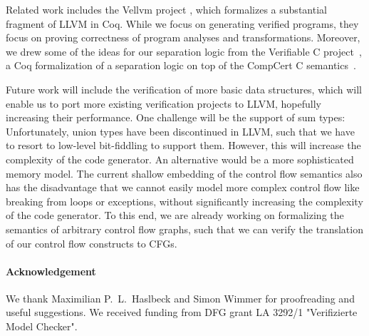 \documentclass[a4paper,oribibl,envcountsame]{llncs}
\begin{document}
Related work includes the Vellvm project \cite{ZNMZ12,ZNMZ13}, which formalizes a substantial fragment of LLVM in Coq.
While we focus on generating verified programs, they focus on proving correctness of program analyses and transformations. 
Moreover, we drew some of the ideas for our separation logic from the Verifiable C project~\cite{App14}, a Coq formalization of a separation logic on top of the CompCert C semantics~\cite{BL09}.

Future work will include the verification of more basic data structures, which will enable us to 
port more existing verification projects to LLVM, hopefully increasing their performance. 
One challenge will be the support of sum types: Unfortunately, union types have been discontinued in LLVM, such that we have to resort 
to low-level bit-fiddling to support them. However, this will increase the complexity of the code generator. An alternative would be a more sophisticated memory model.
The current shallow embedding of the control flow semantics also has the disadvantage that we cannot easily model more complex control flow like breaking from loops or exceptions, without significantly increasing the complexity of the code generator. To this end, we are already working on formalizing the semantics of 
arbitrary control flow graphs, such that we can verify the translation of our control flow constructs to CFGs.


{\footnotesize
\paragraph{\footnotesize Acknowledgement}
We thank Maximilian P.\ L.\ Haslbeck and Simon Wimmer for proofreading and useful suggestions.
We received funding from DFG grant LA 3292/1 "Verifizierte Model Checker".
}

\clearpage

% 
% 
% 
% 
% 
% 
  
  
  
% 
% 



\end{document}
